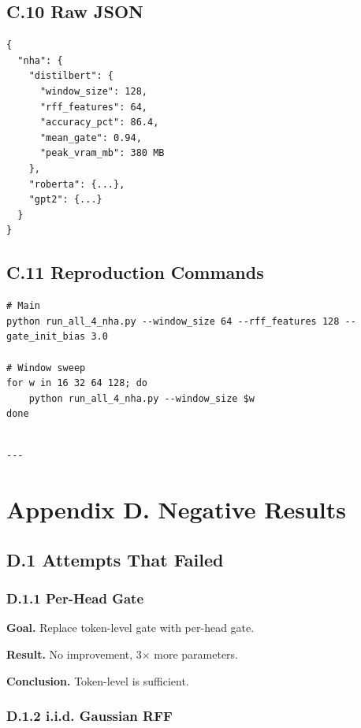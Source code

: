 \subsection{C.10 Raw JSON}

\begin{lstlisting}
{
  "nha": {
    "distilbert": {
      "window_size": 128,
      "rff_features": 64,
      "accuracy_pct": 86.4,
      "mean_gate": 0.94,
      "peak_vram_mb": 380 MB
    },
    "roberta": {...},
    "gpt2": {...}
  }
}
\end{lstlisting}

\subsection{C.11 Reproduction Commands}

\begin{lstlisting}
# Main
python run_all_4_nha.py --window_size 64 --rff_features 128 --gate_init_bias 3.0

# Window sweep
for w in 16 32 64 128; do
    python run_all_4_nha.py --window_size $w
done
\end{lstlisting}
\begin{lstlisting}

---
\end{lstlisting}


\section{Appendix D. Negative Results}

\subsection{D.1 Attempts That Failed}

\subsubsection{D.1.1 Per-Head Gate}

\textbf{Goal.} Replace token-level gate with per-head gate.

\textbf{Result.} No improvement, 3$\times$ more parameters.

\textbf{Conclusion.} Token-level is sufficient.

\subsubsection{D.1.2 i.i.d. Gaussian RFF}

